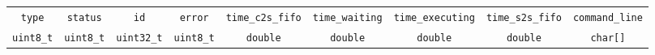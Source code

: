 \documentclass[11pt]{article}
\begin{document}
\scriptsize
\begin{adjustwidth}{-1in}{-1in}
    \begin{center}
        \begin{tabular}{|c|c|c|c|c|c|c|c|c|}
            \hline
                \texttt{type}            &
                \texttt{status}          &
                \texttt{id}              &
                \texttt{error}           &
                \texttt{time\_c2s\_fifo} &
                \texttt{time\_waiting}   &
                \texttt{time\_executing} &
                \texttt{time\_s2s\_fifo} &
                \texttt{command\_line}   \\

                \texttt{uint8\_t}  &
                \texttt{uint8\_t}  &
                \texttt{uint32\_t} &
                \texttt{uint8\_t}  &
                \texttt{double}    &
                \texttt{double}    &
                \texttt{double}    &
                \texttt{double}    &
                \texttt{char[]}    \\
            \hline
        \end{tabular}
    \end{center}
\end{adjustwidth}
\end{document}
